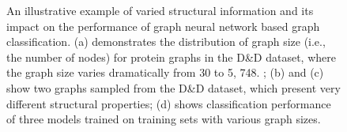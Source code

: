 \documentclass[11pt,dvipdfm]{article}
\begin{document}
\begin{figure}%

    \centering
    
    \qquad

    \caption{An illustrative example of varied structural information and its impact on the performance of graph neural network based graph classification. (a) demonstrates the distribution of graph size (i.e., the number of nodes) for protein graphs in the D\&D dataset, where the graph size
    varies dramatically from 30 to 5, 748. ; (b) and (c) show two graphs sampled from the D\&D dataset, which present very different structural properties; (d) shows classification performance of three models trained on training sets with various graph sizes.}%

    \label{fig:yiqi_DD-intro}

\end{figure}
\end{document}
